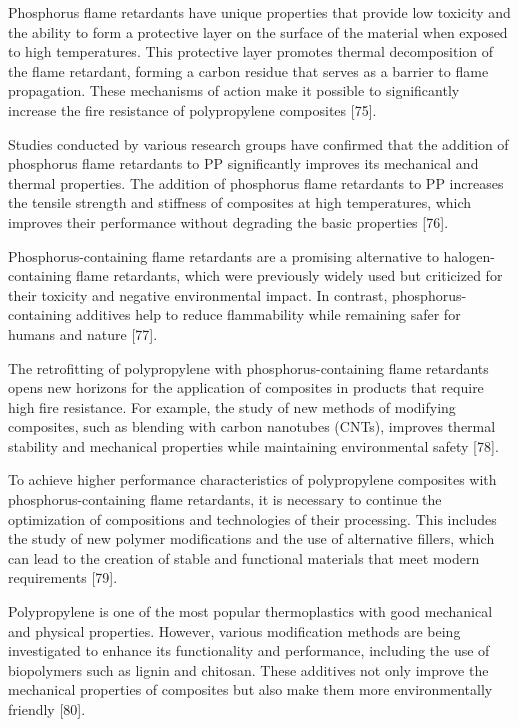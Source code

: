 Phosphorus flame retardants have unique properties that provide low
toxicity and the ability to form a protective layer on the surface of
the material when exposed to high temperatures. This protective layer
promotes thermal decomposition of the flame retardant, forming a carbon
residue that serves as a barrier to flame propagation. These mechanisms
of action make it possible to significantly increase the fire resistance
of polypropylene composites {[}75{]}.

Studies conducted by various research groups have confirmed that the
addition of phosphorus flame retardants to PP significantly improves its
mechanical and thermal properties. The addition of phosphorus flame
retardants to PP increases the tensile strength and stiffness of
composites at high temperatures, which improves their performance
without degrading the basic properties {[}76{]}.

Phosphorus-containing flame retardants are a promising alternative to
halogen-containing flame retardants, which were previously widely used
but criticized for their toxicity and negative environmental impact. In
contrast, phosphorus-containing additives help to reduce flammability
while remaining safer for humans and nature {[}77{]}.

The retrofitting of polypropylene with phosphorus-containing flame
retardants opens new horizons for the application of composites in
products that require high fire resistance. For example, the study of
new methods of modifying composites, such as blending with carbon
nanotubes (CNTs), improves thermal stability and mechanical properties
while maintaining environmental safety {[}78{]}.

To achieve higher performance characteristics of polypropylene
composites with phosphorus-containing flame retardants, it is necessary
to continue the optimization of compositions and technologies of their
processing. This includes the study of new polymer modifications and the
use of alternative fillers, which can lead to the creation of stable and
functional materials that meet modern requirements {[}79{]}.

Polypropylene is one of the most popular thermoplastics with good
mechanical and physical properties. However, various modification
methods are being investigated to enhance its functionality and
performance, including the use of biopolymers such as lignin and
chitosan. These additives not only improve the mechanical properties of
composites but also make them more environmentally friendly {[}80{]}.

